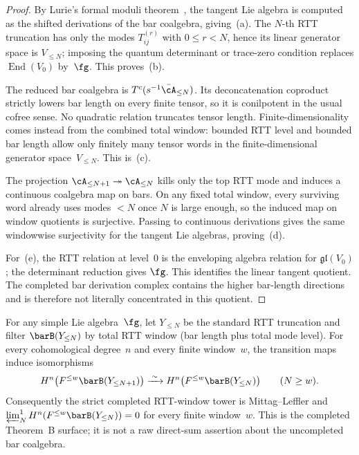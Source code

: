 \begin{proof}
By Lurie's formal moduli theorem~\cite{LurieDAGX}, the tangent
Lie algebra is computed as the shifted derivations of the bar
coalgebra, giving~(a). The $N$-th RTT truncation has only the modes
$T_{ij}^{(r)}$ with $0\le r<N$, hence its linear generator space is
$V_{\leq N}$; imposing the quantum determinant or trace-zero
condition replaces $\operatorname{End}(V_0)$ by~$\fg$. This proves~(b).

The reduced bar coalgebra is $T^c(s^{-1}\bar\cA_{\leq N})$.
Its deconcatenation coproduct strictly lowers bar length on every
finite tensor, so it is conilpotent in the usual cofree sense. No
quadratic relation truncates tensor length. Finite-dimensionality
comes instead from the combined total window: bounded RTT level and
bounded bar length allow only finitely many tensor words in the
finite-dimensional generator space~$V_{\leq N}$. This is~(c).

The projection $\cA_{\leq N+1}\twoheadrightarrow\cA_{\leq N}$ kills
only the top RTT mode and induces a continuous coalgebra map on bars.
On any fixed total window, every surviving word already uses modes
$<N$ once $N$ is large enough, so the induced map on window quotients
is surjective. Passing to continuous derivations gives the same
windowwise surjectivity for the tangent Lie algebras, proving~(d).

For~(e), the RTT relation at level~$0$ is the enveloping algebra
relation for $\mathfrak{gl}(V_0)$; the determinant reduction gives
$\fg$. This identifies the linear tangent quotient. The completed bar
derivation complex contains the higher bar-length directions and is
therefore not literally concentrated in this quotient.
\end{proof}

\begin{theorem}
\label{thm:rtt-mittag-leffler}
For any simple Lie algebra~$\fg$, let $Y_{\leq N}$ be the standard
RTT truncation and filter $\barB(Y_{\leq N})$ by total RTT window
(\textup{bar length plus total mode level}). For every cohomological
degree~$n$ and every finite window~$w$, the transition maps induce
isomorphisms
\[
H^n\bigl(F^{\leq w}\barB(Y_{\leq N+1})\bigr)
\xrightarrow{\;\sim\;}
H^n\bigl(F^{\leq w}\barB(Y_{\leq N})\bigr)
\qquad (N\geq w).
\]
Consequently the strict completed RTT-window tower is
Mittag--Leffler and
$\varprojlim^1_N H^n(F^{\leq w}\barB(Y_{\leq N}))=0$ for every
finite window~$w$. This is the completed Theorem~B surface; it is not
a raw direct-sum assertion about the uncompleted bar coalgebra.
\end{theorem}


